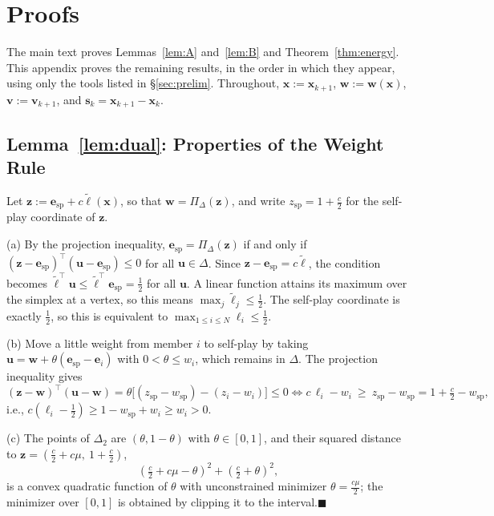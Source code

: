 \documentclass{article}
\theoremstyle{plain}
\theoremstyle{remark}
\newcommand{\Proj}{\Pi}
\newcommand{\simplex}{\Delta}
\newcommand{\bx}{{\bm{x}}}
\newcommand{\bv}{{\bm{v}}}
\newcommand{\bw}{{\bm{w}}}
\newcommand{\bz}{{\bm{z}}}
\newcommand{\bu}{{\bm{u}}}
\newcommand{\be}{{\bm{e}}}
\newcommand{\bell}{{\bm{\ell}}}
\newcommand{\aug}{\tilde{\bell}}
\newcommand{\dx}{{\bm{s}}}
\newcommand{\esp}{\be_{\mathrm{sp}}}
\newcommand{\wsp}{w_{\mathrm{sp}}}
\begin{document}



\appendix
\section{Proofs}
\label{app:proofs}

The main text proves Lemmas~\ref{lem:A} and~\ref{lem:B} and Theorem~\ref{thm:energy}. This appendix proves the remaining results, in the order in which they appear, using only the tools listed in \S\ref{sec:prelim}. Throughout, $\bx:=\bx_{k+1}$, $\bw:=\bw(\bx)$, $\bv:=\bv_{k+1}$, and $\dx_k=\bx_{k+1}-\bx_k$.

\subsection{Lemma~\ref{lem:dual}: Properties of the Weight Rule}
\label{app:dual}

Let $\bz:=\esp+c\aug(\bx)$, so that $\bw=\Proj_\simplex(\bz)$, and write $z_{\mathrm{sp}}=1+\tfrac c2$ for the self-play coordinate of $\bz$.

(a) By the projection inequality, $\esp=\Proj_\simplex(\bz)$ if and only if $(\bz-\esp)^\top(\bu-\esp)\le0$ for all $\bu\in\simplex$. Since $\bz-\esp=c\aug$, the condition becomes $\aug^\top \bu\le\aug^\top \esp=\tfrac12$ for all $\bu$. A linear function attains its maximum over the simplex at a vertex, so this means $\max_j\tilde\ell_j\le\tfrac12$. The self-play coordinate is exactly $\tfrac12$, so this is equivalent to $\max_{1\le i\le N}\ell_i\le\tfrac12$.

(b) Move a little weight from member $i$ to self-play by taking $\bu=\bw+\theta(\esp-\be_i)$ with $0<\theta\le w_i$, which remains in $\simplex$. The projection inequality gives
\[
(\bz-\bw)^\top(\bu-\bw)=\theta\big[(z_{\mathrm{sp}}-\wsp)-(z_i-w_i)\big]\le0
\iff c\,\ell_i-w_i\ \ge\ z_{\mathrm{sp}}-\wsp=1+\tfrac c2-\wsp ,
\]
i.e., $c(\ell_i-\tfrac12)\ge1-\wsp+w_i\ge w_i>0$.

(c) The points of $\simplex_2$ are $(\theta,1-\theta)$ with $\theta\in[0,1]$, and their squared distance to $\bz=(\tfrac c2+c\mu,\ 1+\tfrac c2)$,
\[
(\tfrac c2+c\mu-\theta)^2+(\tfrac c2+\theta)^2 ,
\]
is a convex quadratic function of $\theta$ with unconstrained minimizer $\theta=\tfrac{c\mu}2$; the minimizer over $[0,1]$ is obtained by clipping it to the interval.\hfill$\blacksquare$
\end{document}

